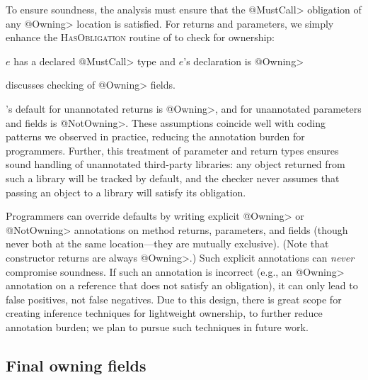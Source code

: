 To ensure soundness, the analysis must ensure that the \<@MustCall> obligation
of any \<@Owning> location is satisfied.  For returns and parameters, we simply
enhance the \textsc{HasObligation} routine of  to check for
ownership:
\begin{algorithmic}
  \State \Return $e$ has a declared \<@MustCall> type and $e$'s declaration is \<@Owning>
  \EndProcedure
\end{algorithmic}
 discusses checking of \<@Owning> fields.

\Tool's default for unannotated returns is \<@Owning>,
and for unannotated parameters and fields is \<@NotOwning>.  These assumptions
coincide well with coding patterns we observed in practice, reducing the
annotation burden for programmers.  Further, this treatment of parameter and
return types ensures sound handling of unannotated third-party libraries: any
object returned from such a library will be tracked by default, and the checker
never assumes that passing an object to a library will satisfy its obligation.

Programmers can override defaults by writing explicit \<@Owning> or
\<@NotOwning> annotations on method returns, parameters, and fields (though never both at the same
location---they are mutually exclusive).  (Note that constructor returns are always
\<@Owning>.)  Such explicit annotations can
\emph{never} compromise soundness.  If such an annotation is incorrect (e.g., an
\<@Owning> annotation on a reference that does not satisfy an obligation), it
can only lead to false positives, not false negatives.  Due to this design,
there is great scope for creating inference techniques for lightweight
ownership, to further reduce annotation burden; we plan to pursue such
techniques in future work.


\subsection{Final owning fields}
\label{sec:owning-fields}


